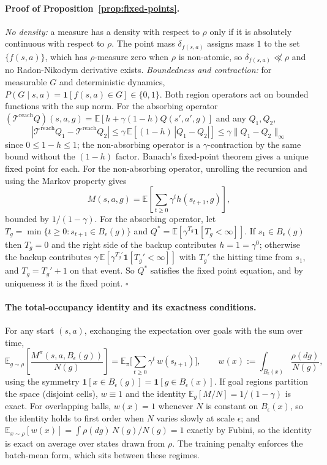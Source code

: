 \documentclass{article}
\newcommand{\E}{\mathbb{E}}
\newcommand{\ind}[1]{\mathbf{1}\!\left[#1\right]}
\newcommand{\Reach}{\mathrm{reach}}
\begin{document}
\paragraph{Proof of Proposition~\ref{prop:fixed-points}.}
\emph{No density:} a measure has a density with respect to $\rho$ only if it is absolutely continuous with respect to $\rho$.
The point mass $\delta_{f(s,a)}$ assigns mass $1$ to the set $\{f(s,a)\}$, which has $\rho$-measure zero when $\rho$ is non-atomic, so $\delta_{f(s,a)}\not\ll\rho$ and no Radon-Nikodym derivative exists.
\emph{Boundedness and contraction:} for measurable $G$ and deterministic dynamics, $P(G\mid s,a)=\ind{f(s,a)\in G}\in\{0,1\}$.
Both region operators act on bounded functions with the sup norm.
For the absorbing operator $(\mathcal{T}^{\Reach}Q)(s,a,g)=\E[h+\gamma(1-h)Q(s',a',g)]$ and any $Q_1,Q_2$,
\begin{equation*}
|\mathcal{T}^{\Reach}Q_1-\mathcal{T}^{\Reach}Q_2| \le\gamma\,\E[(1-h)\,|Q_1-Q_2|]\le\gamma\|Q_1-Q_2\|_\infty
\end{equation*}
since $0\le 1-h\le 1$; the non-absorbing operator is a $\gamma$-contraction by the same bound without the $(1-h)$ factor.
Banach's fixed-point theorem gives a unique fixed point for each.
For the non-absorbing operator, unrolling the recursion and using the Markov property gives
\begin{equation*}
M(s,a,g)=\E[\sum_{t\ge0}\gamma^{t}h(s_{t+1},g)],
\end{equation*}
bounded by $1/(1-\gamma)$.
For the absorbing operator, let $T_g=\min\{t\ge0:s_{t+1}\in B_\epsilon(g)\}$ and $Q^{*}=\E[\gamma^{T_g}\ind{T_g<\infty}]$.
If $s_{1}\in B_\epsilon(g)$ then $T_g=0$ and the right side of the backup contributes $h=1=\gamma^{0}$; otherwise the backup contributes $\gamma\,\E[\gamma^{T_g'}\ind{T_g'<\infty}]$ with $T_g'$ the hitting time from $s_{1}$, and $T_g=T_g'+1$ on that event.
So $Q^{*}$ satisfies the fixed point equation, and by uniqueness it is the fixed point.
\hfill$\square$

\paragraph{The total-occupancy identity and its exactness conditions.}
For any start $(s,a)$, exchanging the expectation over goals with the sum over time,
\begin{equation*}
\E_{g\sim\rho}\!\left[\frac{M^{\pi}(s,a,B_\epsilon(g))}{N(g)}\right] =\E_{\pi}\Big[\sum_{t\ge0}\gamma^{t}\,w(s_{t+1})\Big], \qquad w(x):=\int_{B_\epsilon(x)}\frac{\rho(dg)}{N(g)},
\end{equation*}
using the symmetry $\ind{x\in B_\epsilon(g)}=\ind{g\in B_\epsilon(x)}$.
If goal regions partition the space (disjoint cells), $w\equiv1$ and the identity $\E_{g}[M/N]=1/(1-\gamma)$ is exact.
For overlapping balls, $w(x)=1$ whenever $N$ is constant on $B_\epsilon(x)$, so the identity holds to first order when $N$ varies slowly at scale $\epsilon$; and $\E_{x\sim\rho}[w(x)]=\int\rho(dg)\,N(g)/N(g)=1$ exactly by Fubini, so the identity is exact on average over states drawn from $\rho$.
The training penalty enforces the batch-mean form, which sits between these regimes.
\end{document}
